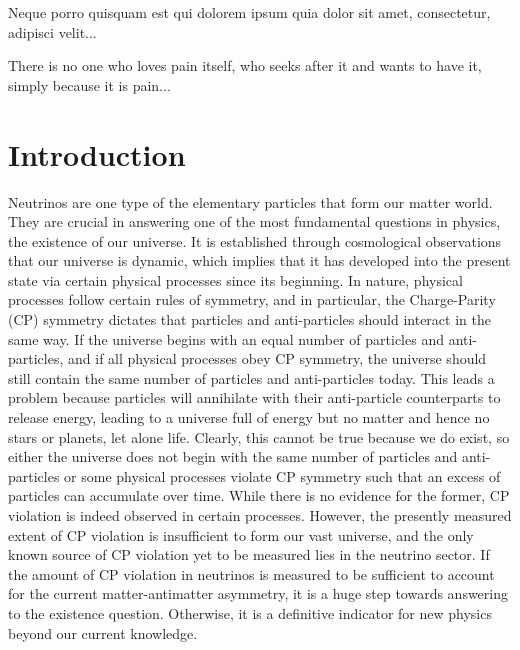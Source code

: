 \begin{savequote}[8cm]
\textlatin{Neque porro quisquam est qui dolorem ipsum quia dolor sit amet, consectetur, adipisci velit...}

There is no one who loves pain itself, who seeks after it and wants to have it, simply because it is pain...
\end{savequote}

\chapter{\label{ch:intro}Introduction} 

\minitoc

Neutrinos are one type of the elementary particles that form our matter world. 
They are crucial in answering one of the most fundamental questions in physics, the existence of our universe. 
It is established through cosmological observations that our universe is dynamic, which implies that it has developed into the present state via certain physical processes since its beginning.  
In nature, physical processes follow certain rules of symmetry, and in particular, the Charge-Parity (CP) symmetry dictates that particles and anti-particles should interact in the same way. 
If the universe begins with an equal number of particles and anti-particles, and if all physical processes obey CP symmetry, the universe should still contain the same number of particles and anti-particles today.
This leads a problem because particles will annihilate with their anti-particle counterparts to release energy, leading to a universe full of energy but no matter and hence no stars or planets, let alone life.
Clearly, this cannot be true because we do exist, so either the universe does not begin with the same number of particles and anti-particles or some physical processes violate CP symmetry such that an excess of particles can accumulate over time. 
While there is no evidence for the former, CP violation is indeed observed in certain processes. 
However, the presently measured extent of CP violation is insufficient to form our vast universe, and the only known source of CP violation yet to be measured lies in the neutrino sector. 
If the amount of CP violation in neutrinos is measured to be sufficient to account for the current matter-antimatter asymmetry, it is a huge step towards answering to the existence question. 
Otherwise, it is a definitive indicator for new physics beyond our current knowledge. 

